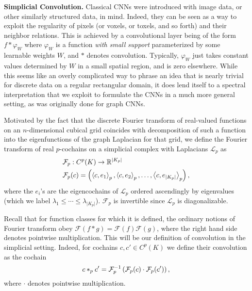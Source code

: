 
\textbf{Simplicial Convolution.} Classical CNNs were introduced with image data, or other similarly structured data, in mind. Indeed, they can be seen as a way to exploit the regularity of pixels (or voxels, or toxels, and so forth) and their neighbor relations. This is achieved by a convolutional layer being of the form $f\ast \varphi_W$ where $\varphi_W$ is a function \emph{with small support} parameterized by some learnable weights $W$, and $\ast$ denotes convolution. Typically, $\varphi_W$ just takes constant values determined by $W$ in a small spatial region, and is zero elsewhere. While this seems like an overly complicated way to phrase an idea that is nearly trivial for discrete data on a regular rectangular domain, it does lend itself to a spectral interpretation that we exploit to formulate the CNNs in a much more general setting, as was originally done for graph CNNs.

Motivated by the fact that the discrete Fourier transform of real-valued functions on an $n$-dimensional cubical grid coincides with decomposition of such a function into the eigenfunctions of the graph Laplacian for that grid, we define the Fourier transform of real $p$-cochains on a simplicial complex with Laplacians $\mathcal{L}_p$ as
\begin{align*}
  &\mathcal{F}_p: C^p(K) \to \mathbb{R}^{\lvert K_p \rvert} \\
  &\mathcal{F}_p(c) = \left(\left\langle c , e_1 \right\rangle_p, \left\langle c , e_2 \right\rangle_p, \dotsc, \left\langle c , e_{\lvert K_p \rvert} \right\rangle_p\right),
\end{align*}
where the $e_i$'s are the eigencochains of $\mathcal{L}_p$ ordered ascendingly by eigenvalues (which we label $\lambda_1\leq\dotsm\leq\lambda_{\lvert K_p \rvert}$). $\mathcal{F}_p$ is invertible since $\mathcal{L}_p$ is diagonalizable.

Recall that for function classes for which it is defined, the ordinary notions of Fourier transform obey $\mathcal{F}(f\ast g)=\mathcal{F}(f)\mathcal{F}(g)$, where the right hand side denotes pointwise multiplication. This will be our definition of convolution in the simplicial setting. Indeed, for cochains $c,c'\in C^p(K)$ we define their convolution as the cochain
\begin{equation*}
  c\ast_p c' = \mathcal{F}_p^{-1}\left(\mathcal{F}_p(c)\cdot\mathcal{F}_p(c')\right),
\end{equation*}
where $\cdot$ denotes pointwise multiplication.

